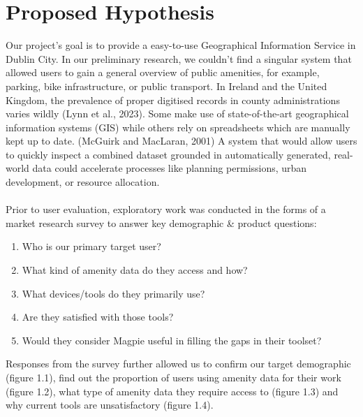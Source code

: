 \documentclass{report}
\begin{document}
\section{Proposed Hypothesis}
Our project's goal is to provide a easy-to-use Geographical Information Service
in Dublin City. In our preliminary research, we couldn’t find a singular
system that allowed users to gain a general overview of public amenities, for
example, parking, bike infrastructure, or public transport. In Ireland and the
United Kingdom, the prevalence of proper digitised records in county
administrations varies wildly (Lynn et al., 2023). Some make use of
state-of-the-art geographical information systems (GIS) while others rely on
spreadsheets which are manually kept up to date. (McGuirk and MacLaran, 2001) A
system that would allow users to quickly inspect a combined dataset grounded in
automatically generated, real-world data could accelerate processes like
planning permissions, urban development, or resource allocation.\\ \\
Prior to user evaluation, exploratory work was conducted in the forms of a
market research survey to answer key demographic \& product questions:
\begin{enumerate}
    \item Who is our primary target user?
    \item What kind of amenity data do they access and how?
    \item What devices/tools do they primarily use?
    \item Are they satisfied with those tools?
    \item Would they consider Magpie useful in filling the gaps in their
          toolset?
\end{enumerate}
Responses from the survey further allowed us to confirm our target demographic
(figure 1.1), find out the proportion of users using amenity data for their work
(figure 1.2), what type of amenity data  they require access to (figure 1.3) and
why current tools are unsatisfactory (figure 1.4).
\end{document}

